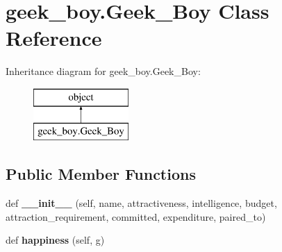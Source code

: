 \hypertarget{classgeek__boy_1_1_geek___boy}{}\section{geek\+\_\+boy.\+Geek\+\_\+\+Boy Class Reference}
\label{classgeek__boy_1_1_geek___boy}
Inheritance diagram for geek\+\_\+boy.\+Geek\+\_\+\+Boy\+:\begin{figure}[H]
\begin{center}
\leavevmode
\includegraphics[height=2.000000cm]{classgeek__boy_1_1_geek___boy}
\end{center}
\end{figure}
\subsection*{Public Member Functions}
\begin{DoxyCompactItemize}
\item 
\mbox{\label{classgeek__boy_1_1_geek___boy_ae4df402c3dda6877a3957e4bdd41b228}} 
def {\bfseries \+\_\+\+\_\+init\+\_\+\+\_\+} (self, name, attractiveness, intelligence, budget, attraction\+\_\+requirement, committed, expenditure, paired\+\_\+to)
\item 
\mbox{\label{classgeek__boy_1_1_geek___boy_a651f4b0e255c1585737ffd0a93099edd}} 
def {\bfseries happiness} (self, g)
\end{DoxyCompactItemize}
